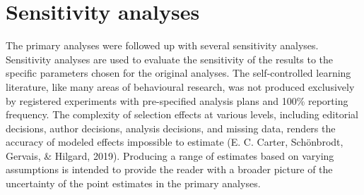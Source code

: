 \documentclass[
  english,
  man,floatsintext]{apa7}
\begin{document}
\hypertarget{sensitivity-analyses}{%
\section{Sensitivity analyses}\label{sensitivity-analyses}}

The primary analyses were followed up with several sensitivity analyses. Sensitivity analyses are used to evaluate the sensitivity of the results to the specific parameters chosen for the original analyses. The self-controlled learning literature, like many areas of behavioural research, was not produced exclusively by registered experiments with pre-specified analysis plans and 100\% reporting frequency. The complexity of selection effects at various levels, including editorial decisions, author decisions, analysis decisions, and missing data, renders the accuracy of modeled effects impossible to estimate (E. C. Carter, Schönbrodt, Gervais, \& Hilgard, 2019). Producing a range of estimates based on varying assumptions is intended to provide the reader with a broader picture of the uncertainty of the point estimates in the primary analyses.
\end{document}
